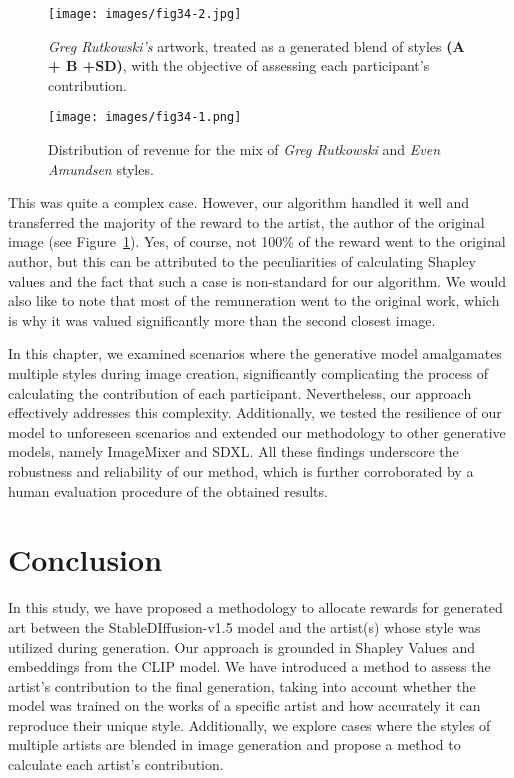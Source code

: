 \documentclass[12pt, letterpaper]{article}
\begin{document}
\begin{figure}[h]
    \centering
    \begin{minipage}{0.44\textwidth}
        \centering
        \texttt{[image: images/fig34-2.jpg]}
        \caption{\textit{Greg Rutkowski's} artwork, treated as a generated blend of styles \textbf{(A + B +SD)}, with the objective of assessing each participant's contribution.}
        \label{fig34:second_image}
    \end{minipage}
    \begin{minipage}{0.52\textwidth}
        \centering
        \texttt{[image: images/fig34-1.png]}
        \caption{Distribution of revenue for the mix of \textit{Greg Rutkowski} and \textit{Even Amundsen} styles.}
        \label{fig34:first_image}
    \end{minipage}
\end{figure}

This was quite a complex case. However, our algorithm handled it well and transferred the majority of the reward to the artist, the author of the original image (see Figure~\ref{fig34:first_image}). Yes, of course, not 100\% of the reward went to the original author, but this can be attributed to the peculiarities of calculating Shapley values and the fact that such a case is non-standard for our algorithm. We would also like to note that most of the remuneration went to the original work, which is why it was valued significantly more than the second closest image.

In this chapter, we examined scenarios where the generative model amalgamates multiple styles during image creation, significantly complicating the process of calculating the contribution of each participant. Nevertheless, our approach effectively addresses this complexity. Additionally, we tested the resilience of our model to unforeseen scenarios and extended our methodology to other generative models, namely ImageMixer and SDXL. All these findings underscore the robustness and reliability of our method, which is further corroborated by a human evaluation procedure of the obtained results.


\section{Conclusion}
In this study, we have proposed a methodology to allocate rewards for generated art between the StableDIffusion-v1.5 model and the artist(s) whose style was utilized during generation. Our approach is grounded in Shapley Values and embeddings from the CLIP model. We have introduced a method to assess the artist's contribution to the final generation, taking into account whether the model was trained on the works of a specific artist and how accurately it can reproduce their unique style. Additionally, we explore cases where the styles of multiple artists are blended in image generation and propose a method to calculate each artist's contribution.
\end{document}
